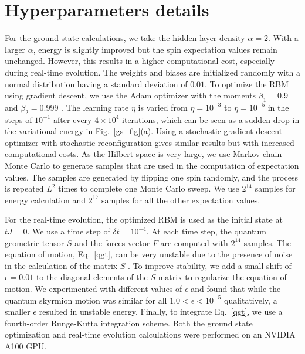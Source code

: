 \documentclass[aps,prb,twocolumn,superscriptaddress,a4paper,longbibliography]{revtex4-2}
\begin{document}
\appendix
\section{Hyperparameters details}
\label{appendix_A}

For the ground-state calculations, we take the hidden layer density $\alpha=2$. With a larger $\alpha$, energy is slightly improved but the spin expectation values remain unchanged. However, this results in a higher computational cost, especially during real-time evolution. The weights and biases are initialized randomly with a normal distribution having a standard deviation of $0.01$. To optimize the RBM using gradient descent, we use the Adam optimizer with the moments $\beta_1=0.9$ and $\beta_2=0.999$ \cite{kingma_adam_2017}. The learning rate $\eta$ is varied from $\eta=10^{-3}$ to $\eta=10^{-5}$ in the steps of $10^{-1}$ after every $4\times 10^4$ iterations, which can be seen as a sudden drop in the variational energy in Fig.~\ref{gs_fig}(a). Using a stochastic gradient descent optimizer with stochastic reconfiguration \cite{carleo_solving_2017} gives similar results but with increased computational costs. As the Hilbert space is very large, we use Markov chain Monte Carlo to generate samples that are used in the computation of expectation values. The samples are generated by flipping one spin randomly, and the process is repeated $L^2$ times to complete one Monte Carlo sweep. We use $2^{14}$ samples for energy calculation and $2^{17}$ samples for all the other expectation values. 

For the real-time evolution, the optimized RBM is used as the initial state at $tJ=0$. We use a time step of $\delta t=10^{-4}$. At each time step, the quantum geometric tensor $S$ and the forces vector $F$ are computed with $2^{14}$ samples. The equation of motion, Eq.~\eqref{qgt}, can be very unstable due to the presence of noise in the calculation of the matrix $S$ \cite{schmitt_quantum_2020,sinibaldi_unbiasing_2023,hofmann_role_2022}. To improve stability, we add a small shift of $\epsilon=0.01$ to the diagonal elements of the $S$ matrix to regularize the equation of motion. We experimented with different values of $\epsilon$ and found that while the quantum skyrmion motion was similar for all $1.0<\epsilon<10^{-5}$ qualitatively, a smaller $\epsilon$ resulted in unstable energy. Finally, to integrate Eq.~\eqref{qgt}, we use a fourth-order Runge-Kutta integration scheme. Both the ground state optimization and real-time evolution calculations were performed on an NVIDIA A100 GPU.
\end{document}

